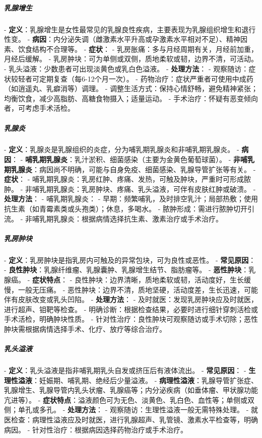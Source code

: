 \begin{enumerate}
\subparagraph{乳腺增生}
- \textbf{定义}：乳腺增生是女性最常见的乳腺良性疾病，主要表现为乳腺组织增生和退行性变。
- \textbf{病因}：内分泌失调（雌激素水平升高或孕激素水平相对不足）、精神因素、饮食结构不合理等。
- \textbf{症状}：
  - 乳房胀痛：多与月经周期有关，月经前加重，月经后缓解。
  - 乳房肿块：可为单侧或双侧，质地柔软或韧，边界不清，可活动。
  - 乳头溢液：少数患者可出现淡黄色或乳白色溢液。
- \textbf{处理方法}：
  - 观察随访：症状较轻者可定期复查（每6-12个月一次）。
  - 药物治疗：症状严重者可使用中成药（如逍遥丸、乳癖消等）调理。
  - 调整生活方式：保持心情舒畅，避免精神紧张；均衡饮食，减少高脂肪、高糖食物摄入；适量运动。
  - 手术治疗：怀疑有恶变倾向者，可考虑手术活检。

\subparagraph{乳腺炎}
- \textbf{定义}：乳腺炎是乳腺组织的炎症，分为哺乳期乳腺炎和非哺乳期乳腺炎。
- \textbf{病因}：
  - \textbf{哺乳期乳腺炎}：乳汁淤积、细菌感染（主要为金黄色葡萄球菌）。
  - \textbf{非哺乳期乳腺炎}：病因尚不明确，可能与自身免疫、细菌感染、乳腺导管扩张等有关。
- \textbf{症状}：
  - 哺乳期乳腺炎：乳房红肿、疼痛、发热，可触及肿块，严重时可形成脓肿。
  - 非哺乳期乳腺炎：乳房肿块、疼痛、乳头溢液，可伴有皮肤红肿或破溃。
- \textbf{处理方法}：
  - 哺乳期乳腺炎：
    - 早期：频繁哺乳，及时排空乳汁；局部热敷；使用抗生素（如青霉素类或头孢类）；休息，多喝水。
    - 脓肿形成：需进行脓肿切开引流。
  - 非哺乳期乳腺炎：根据病情选择抗生素、激素治疗或手术治疗。

\subparagraph{乳房肿块}
- \textbf{定义}：乳房肿块是指乳房内可触及的异常包块，可为良性或恶性。
- \textbf{常见原因}：
  - \textbf{良性肿块}：乳腺纤维瘤、乳腺囊肿、乳腺增生结节、脂肪瘤等。
  - \textbf{恶性肿块}：乳腺癌。
- \textbf{症状特点}：
  - 良性肿块：边界清晰，质地柔软或韧，活动度好，生长缓慢，一般无压痛。
  - 恶性肿块：边界不清，质地坚硬，活动度差，生长迅速，可能伴有皮肤改变或乳头凹陷。
- \textbf{处理方法}：
  - 及时就医：发现乳房肿块应及时就医，进行超声、钼靶等检查。
  - 明确诊断：根据检查结果，必要时进行细针穿刺活检或手术活检，明确肿块性质。
  - 针对性治疗：良性肿块可观察随访或手术切除；恶性肿块需根据病情选择手术、化疗、放疗等综合治疗。

\subparagraph{乳头溢液}
- \textbf{定义}：乳头溢液是指非哺乳期乳头自发或挤压后有液体流出。
- \textbf{常见原因}：
  - \textbf{生理性溢液}：妊娠期、哺乳期、绝经后少量溢液。
  - \textbf{病理性溢液}：乳腺导管扩张症、乳腺增生、乳腺导管内乳头状瘤、乳腺癌等；内分泌疾病（如垂体瘤、甲状腺功能亢进等）。
- \textbf{症状特点}：溢液颜色可为无色、淡黄色、乳白色、血性等；单侧或双侧；单孔或多孔。
- \textbf{处理方法}：
  - 观察随访：生理性溢液一般无需特殊处理。
  - 就医检查：病理性溢液应及时就医，进行乳腺超声、乳管镜、激素水平检查等，明确病因。
  - 针对性治疗：根据病因选择药物治疗或手术治疗。


\end{enumerate}
